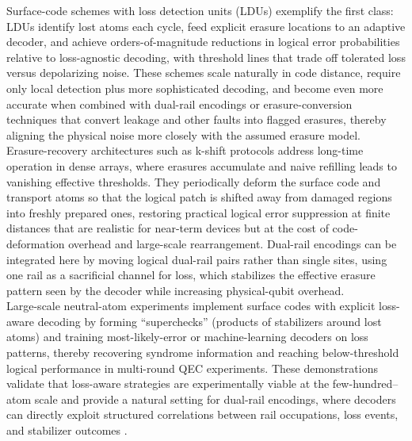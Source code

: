 \documentclass{article}
\begin{document}
Surface-code schemes with loss detection units (LDUs) exemplify the first class: LDUs identify lost atoms each cycle, feed explicit erasure locations to an adaptive decoder, and achieve orders-of-magnitude reductions in logical error probabilities relative to loss-agnostic decoding, with threshold lines that trade off tolerated loss versus depolarizing noise. 
These schemes scale naturally in code distance, require only local detection plus more sophisticated decoding, and become even more accurate when combined with dual-rail encodings or erasure-conversion techniques that convert leakage and other faults into flagged erasures, thereby aligning the physical noise more closely with the assumed erasure model.\\

Erasure-recovery architectures such as k-shift protocols address long-time operation in dense arrays, where erasures accumulate and naive refilling leads to vanishing effective thresholds. 
They periodically deform the surface code and transport atoms so that the logical patch is shifted away from damaged regions into freshly prepared ones, restoring practical logical error suppression at finite distances that are realistic for near-term devices but at the cost of code-deformation overhead and large-scale rearrangement.
Dual-rail encodings can be integrated here by moving logical dual-rail pairs rather than single sites, using one rail as a sacrificial channel for loss, which stabilizes the effective erasure pattern seen by the decoder while increasing physical-qubit overhead.\\

Large-scale neutral-atom experiments implement surface codes with explicit loss-aware decoding by forming “superchecks” (products of stabilizers around lost atoms) and training most-likely-error or machine-learning decoders on loss patterns, thereby recovering syndrome information and reaching below-threshold logical performance in multi-round QEC experiments. 
These demonstrations validate that loss-aware strategies are experimentally viable at the few-hundred–atom scale and provide a natural setting for dual-rail encodings, where decoders can directly exploit structured correlations between rail occupations, loss events, and stabilizer outcomes \cite{perrin2024quantum}.\\
\end{document}
